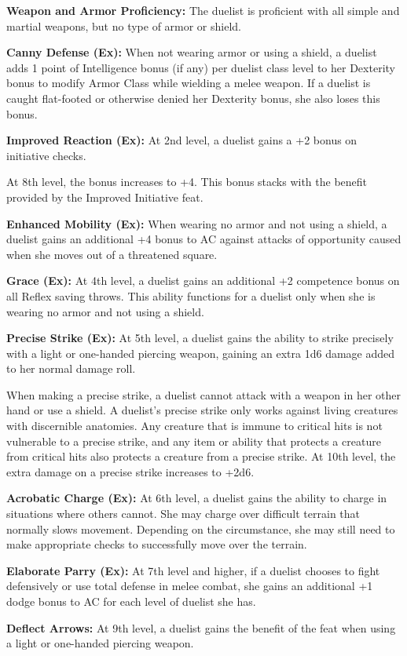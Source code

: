 {
\textbf{Weapon and Armor Proficiency:} The duelist is proficient with all simple and martial weapons, but no type of armor or shield.

\textbf{Canny Defense (Ex):} When not wearing armor or using a shield, a duelist adds 1 point of Intelligence bonus (if any) per duelist class level to her Dexterity bonus to modify Armor Class while wielding a melee weapon. If a duelist is caught flat-footed or otherwise denied her Dexterity bonus, she also loses this bonus.

\textbf{Improved Reaction (Ex):} At 2nd level, a duelist gains a +2 bonus on initiative checks.

At 8th level, the bonus increases to +4. This bonus stacks with the benefit provided by the Improved Initiative feat.

\textbf{Enhanced Mobility (Ex):} When wearing no armor and not using a shield, a duelist gains an additional +4 bonus to AC against attacks of opportunity caused when she moves out of a threatened square.

\textbf{Grace (Ex):} At 4th level, a duelist gains an additional +2 competence bonus on all Reflex saving throws. This ability functions for a duelist only when she is wearing no armor and not using a shield.

\textbf{Precise Strike (Ex):} At 5th level, a duelist gains the ability to strike precisely with a light or one-handed piercing weapon, gaining an extra 1d6 damage added to her normal damage roll.

When making a precise strike, a duelist cannot attack with a weapon in her other hand or use a shield. A duelist's precise strike only works against living creatures with discernible anatomies. Any creature that is immune to critical hits is not vulnerable to a precise strike, and any item or ability that protects a creature from critical hits also protects a creature from a precise strike. At 10th level, the extra damage on a precise strike increases to +2d6.

\textbf{Acrobatic Charge (Ex):} At 6th level, a duelist gains the ability to charge in situations where others cannot. She may charge over difficult terrain that normally slows movement. Depending on the circumstance, she may still need to make appropriate checks to successfully move over the terrain.

\textbf{Elaborate Parry (Ex):} At 7th level and higher, if a duelist chooses to fight defensively or use total defense in melee combat, she gains an additional +1 dodge bonus to AC for each level of duelist she has.

\textbf{Deflect Arrows:} At 9th level, a duelist gains the benefit of the  feat when using a light or one-handed piercing weapon.
}
